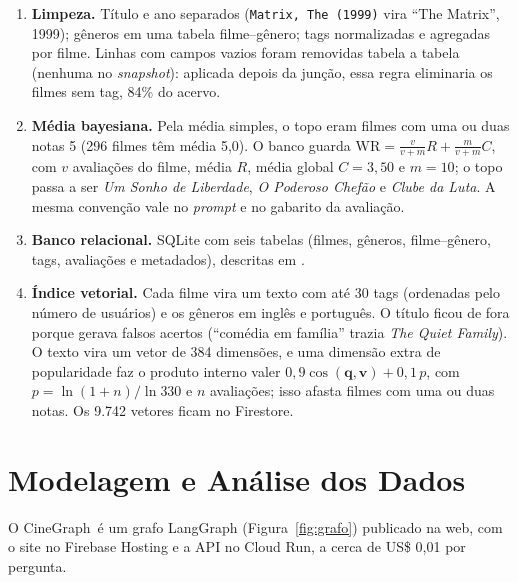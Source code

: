 \documentclass[11pt,a4paper]{article}
\newcommand{\cg}{CineGraph}
\newcommand{\code}[1]{\texttt{#1}}
\begin{document}
\begin{enumerate}
  \item \textbf{Limpeza.} Título e ano separados (\code{Matrix, The (1999)} vira
        \enquote{The Matrix}, 1999); gêneros em uma tabela filme--gênero; tags normalizadas
        e agregadas por filme. Linhas com campos vazios foram removidas tabela a tabela
        (nenhuma no \emph{snapshot}): aplicada depois da junção, essa regra eliminaria os
        filmes sem tag, 84\% do acervo.
  \item \textbf{Média bayesiana.} Pela média simples, o topo eram filmes com uma ou duas
        notas 5 (296 filmes têm média 5,0). O banco guarda
        $\mathrm{WR} = \frac{v}{v+m}R + \frac{m}{v+m}C$, com $v$ avaliações do filme, média
        $R$, média global $C=3{,}50$ e $m=10$; o topo passa a ser \emph{Um Sonho de
        Liberdade}, \emph{O Poderoso Chefão} e \emph{Clube da Luta}. A mesma convenção vale
        no \emph{prompt} e no gabarito da avaliação.
  \item \textbf{Banco relacional.} SQLite com seis tabelas (filmes, gêneros, filme--gênero,
        tags, avaliações e metadados), descritas em .
  \item \textbf{Índice vetorial.} Cada filme vira um texto com até 30 tags (ordenadas pelo
        número de usuários) e os gêneros em inglês e português. O título ficou de fora
        porque gerava falsos acertos (\enquote{comédia em família} trazia \emph{The Quiet
        Family}). O texto vira um vetor de 384 dimensões, e uma dimensão extra de
        popularidade faz o produto interno valer $0{,}9\cos(\mathbf{q},\mathbf{v}) +
        0{,}1\,p$, com $p=\ln(1+n)/\ln 330$ e $n$ avaliações; isso afasta filmes com uma ou
        duas notas. Os 9.742 vetores ficam no Firestore.
\end{enumerate}

\section{Modelagem e Análise dos Dados}

O \cg\ é um grafo LangGraph (Figura~\ref{fig:grafo}) publicado na web, com o site no Firebase
Hosting e a API no Cloud Run, a cerca de US\$ 0,01 por pergunta.
\end{document}
